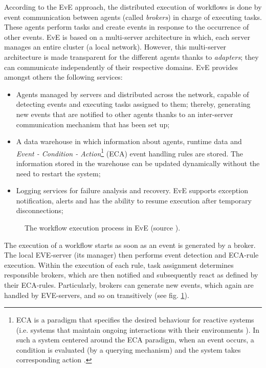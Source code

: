 According to the EvE approach, the distributed execution of workflows is done by event communication between agents (called \textit{brokers}) in charge of executing tasks. These agents perform tasks and create events in response to the occurrence of other events. EvE is based on a multi-server architecture in which, each server manages an entire cluster (a local network). However, this multi-server architecture is made transparent for the different agents thanks to \textit{adapters}; they can communicate independently of their respective domains. EvE provides amongst others the following services: 
\begin{itemize}
	\item Agents managed by servers and distributed across the network, capable of detecting events and executing tasks assigned to them; thereby, generating new events that are notified to other agents thanks to an inter-server communication mechanism that has been set up;
	\item A data warehouse in which information about agents, runtime data and \textit{Event - Condition - Action}\footnote{ECA is a paradigm that specifies the desired behaviour for reactive systems (i.e. systems that maintain ongoing interactions with their environments \cite{manna2012temporal}). In such a system centered around the ECA paradigm, when an event occurs, a condition is evaluated (by a querying mechanism) and the system takes corresponding action \cite{almeida2005modular}.} (ECA) event handling rules are stored. The information stored in the warehouse can be updated dynamically without the need to restart the system;
	\item Logging services for failure analysis and recovery. EvE supports exception notification, alerts and has the ability to resume execution after temporary disconnections;
\end{itemize}
\begin{figure}[ht!]
	\noindent
	\caption{The workflow execution process in EvE (source \cite{eve}).}
	\label{chap1:fig:eve}
\end{figure}

The execution of a workflow starts as soon as an event is generated by a broker. The local EVE-server (its manager) then performs event detection and ECA-rule execution. Within the execution of each rule, task assignment determines responsible brokers, which are then notified and subsequently react as defined by their ECA-rules. Particularly, brokers can generate new events, which again are handled by EVE-servers, and so on transitively (see fig. \ref{chap1:fig:eve}).


